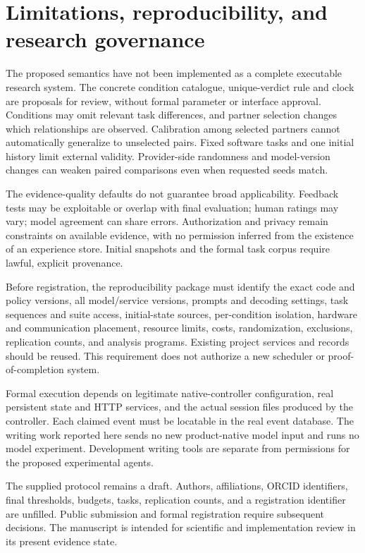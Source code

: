 \documentclass[
  english,
  11pt,
]{article}
\begin{document}
\section{Limitations, reproducibility, and research
governance}\label{limitations-reproducibility-and-research-governance}

The proposed semantics have not been implemented as a complete
executable research system. The concrete condition catalogue,
unique-verdict rule and clock are proposals for review, without formal
parameter or interface approval. Conditions may omit relevant task
differences, and partner selection changes which relationships are
observed. Calibration among selected partners cannot automatically
generalize to unselected pairs. Fixed software tasks and one initial
history limit external validity. Provider-side randomness and
model-version changes can weaken paired comparisons even when requested
seeds match.

The evidence-quality defaults do not guarantee broad applicability.
Feedback tests may be exploitable or overlap with final evaluation;
human ratings may vary; model agreement can share errors. Authorization
and privacy remain constraints on available evidence, with no permission
inferred from the existence of an experience store. Initial snapshots
and the formal task corpus require lawful, explicit provenance.

Before registration, the reproducibility package must identify the exact
code and policy versions, all model/service versions, prompts and
decoding settings, task sequences and suite access, initial-state
sources, per-condition isolation, hardware and communication placement,
resource limits, costs, randomization, exclusions, replication counts,
and analysis programs. Existing project services and records should be
reused. This requirement does not authorize a new scheduler or
proof-of-completion system.

Formal execution depends on legitimate native-controller configuration,
real persistent state and HTTP services, and the actual session files
produced by the controller. Each claimed event must be locatable in the
real event database. The writing work reported here sends no new
product-native model input and runs no model experiment. Development
writing tools are separate from permissions for the proposed
experimental agents.

The supplied protocol remains a draft. Authors, affiliations, ORCID
identifiers, final thresholds, budgets, tasks, replication counts, and a
registration identifier are unfilled. Public submission and formal
registration require subsequent decisions. The manuscript is intended
for scientific and implementation review in its present evidence state.
\end{document}
